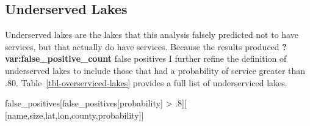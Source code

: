 \documentclass[
]{article}
\newenvironment{Shaded}{\begin{snugshade}}{\end{snugshade}}
\newcommand{\FloatTok}[1]{\textcolor[rgb]{0.68,0.00,0.00}{#1}}
\newcommand{\NormalTok}[1]{\textcolor[rgb]{0.00,0.23,0.31}{#1}}
\newcommand{\OperatorTok}[1]{\textcolor[rgb]{0.37,0.37,0.37}{#1}}
\newcommand{\StringTok}[1]{\textcolor[rgb]{0.13,0.47,0.30}{#1}}
\begin{document}
\subsection{Underserved Lakes}\label{underserved-lakes}

Underserved lakes are the lakes that this analysis falsely predicted not
to have services, but that actually do have services. Because the
results produced \textbf{?var:false\_positive\_count} false positives I
further refine the definition of underserved lakes to include those that
had a probability of service greater than .80.
Table~\ref{tbl-overserviced-lakes} provides a full list of underserviced
lakes.

\begin{Shaded}
\begin{Highlighting}[]
\NormalTok{false\_positives[false\_positives[}\StringTok{\textquotesingle{}probability\textquotesingle{}}\NormalTok{] }\OperatorTok{\textgreater{}} \FloatTok{.8}\NormalTok{][}
\NormalTok{    [}\StringTok{\textquotesingle{}name\textquotesingle{}}\NormalTok{,}\StringTok{\textquotesingle{}size\textquotesingle{}}\NormalTok{,}\StringTok{\textquotesingle{}lat\textquotesingle{}}\NormalTok{,}\StringTok{\textquotesingle{}lon\textquotesingle{}}\NormalTok{,}\StringTok{\textquotesingle{}county\textquotesingle{}}\NormalTok{,}\StringTok{\textquotesingle{}probability\textquotesingle{}}\NormalTok{]]}
\end{Highlighting}
\end{Shaded}
\end{document}
